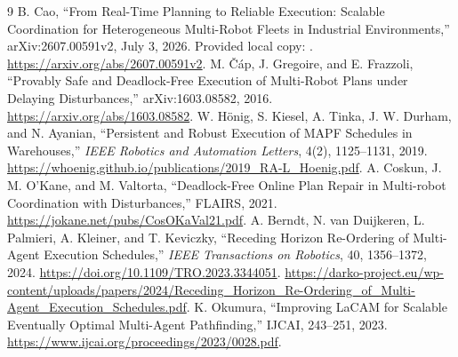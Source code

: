 \documentclass[11pt,a4paper]{article}
\begin{document}
\begin{thebibliography}{9}
 B. Cao, ``From Real-Time Planning to Reliable Execution: Scalable
Coordination for Heterogeneous Multi-Robot Fleets in Industrial Environments,''
arXiv:2607.00591v2, July 3, 2026. Provided local copy:
. \url{https://arxiv.org/abs/2607.00591v2}.
 M. \v{C}\'ap, J. Gregoire, and E. Frazzoli, ``Provably Safe and
Deadlock-Free Execution of Multi-Robot Plans under Delaying Disturbances,''
arXiv:1603.08582, 2016. \url{https://arxiv.org/abs/1603.08582}.
 W. H\"onig, S. Kiesel, A. Tinka, J. W. Durham, and N. Ayanian,
``Persistent and Robust Execution of MAPF Schedules in Warehouses,''
\emph{IEEE Robotics and Automation Letters}, 4(2), 1125--1131, 2019.
\url{https://whoenig.github.io/publications/2019_RA-L_Hoenig.pdf}.
 A. Coskun, J. M. O'Kane, and M. Valtorta, ``Deadlock-Free Online Plan
Repair in Multi-robot Coordination with Disturbances,'' FLAIRS, 2021.
\url{https://jokane.net/pubs/CosOKaVal21.pdf}.
 A. Berndt, N. van Duijkeren, L. Palmieri, A. Kleiner, and T. Keviczky,
``Receding Horizon Re-Ordering of Multi-Agent Execution Schedules,''
\emph{IEEE Transactions on Robotics}, 40, 1356--1372, 2024.
\url{https://doi.org/10.1109/TRO.2023.3344051}.
\url{https://darko-project.eu/wp-content/uploads/papers/2024/Receding_Horizon_Re-Ordering_of_Multi-Agent_Execution_Schedules.pdf}.
 K. Okumura, ``Improving LaCAM for Scalable Eventually Optimal
Multi-Agent Pathfinding,'' IJCAI, 243--251, 2023.
\url{https://www.ijcai.org/proceedings/2023/0028.pdf}.
\end{thebibliography}
\end{document}
